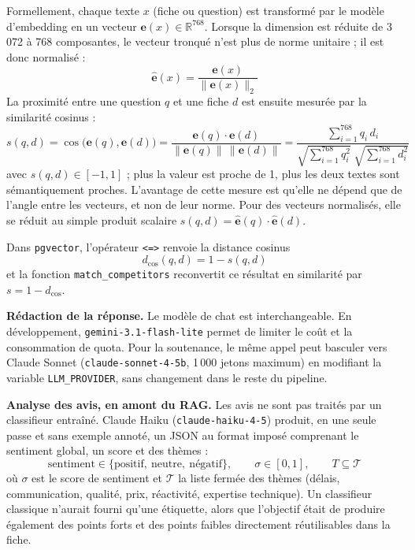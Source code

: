 Formellement, chaque texte $x$ (fiche ou question) est transformé par le modèle d'embedding en un vecteur
$\mathbf{e}(x) \in \mathbb{R}^{768}$. Lorsque la dimension est réduite de 3\,072 à 768 composantes, le vecteur
tronqué n'est plus de norme unitaire ; il est donc normalisé :
\begin{equation}
    \hat{\mathbf{e}}(x) = \frac{\mathbf{e}(x)}{\lVert \mathbf{e}(x) \rVert_2}
    \label{eq:norme}
\end{equation}
La proximité entre une question $q$ et une fiche $d$ est ensuite mesurée par la similarité cosinus :
\begin{equation}
    s(q, d) = \cos\big(\mathbf{e}(q), \mathbf{e}(d)\big)
    = \frac{\mathbf{e}(q) \cdot \mathbf{e}(d)}{\lVert \mathbf{e}(q) \rVert \, \lVert \mathbf{e}(d) \rVert}
    = \frac{\sum_{i=1}^{768} q_i \, d_i}
           {\sqrt{\sum_{i=1}^{768} q_i^{2}} \; \sqrt{\sum_{i=1}^{768} d_i^{2}}}
    \label{eq:cosine}
\end{equation}
avec $s(q,d) \in [-1, 1]$ ; plus la valeur est proche de 1, plus les deux textes sont sémantiquement proches.
L'avantage de cette mesure est qu'elle ne dépend que de l'angle entre les vecteurs, et non de leur norme. Pour
des vecteurs normalisés, elle se réduit au simple produit scalaire $s(q,d) = \hat{\mathbf{e}}(q) \cdot \hat{\mathbf{e}}(d)$.

Dans \texttt{pgvector}, l'opérateur \texttt{<=>} renvoie la distance cosinus
\begin{equation}
    d_{\cos}(q,d) = 1 - s(q,d)
    \label{eq:distance}
\end{equation}
et la fonction \texttt{match\_competitors} reconvertit ce résultat en similarité par $s = 1 - d_{\cos}$.

\textbf{Rédaction de la réponse.} Le modèle de chat est interchangeable. En développement,
\texttt{gemini-3.1-flash-lite} permet de limiter le coût et la consommation de quota. Pour la soutenance, le
même appel peut basculer vers Claude Sonnet (\texttt{claude-sonnet-4-5b}, 1\,000 jetons maximum) en
modifiant la variable \texttt{LLM\_PROVIDER}, sans changement dans le reste du pipeline.

\textbf{Analyse des avis, en amont du RAG.} Les avis ne sont pas traités par un classifieur entraîné. Claude
Haiku (\texttt{claude-haiku-4-5}) produit, en une seule passe et sans exemple annoté, un JSON au format imposé
comprenant le sentiment global, un score et des thèmes :
\begin{equation}
    \text{sentiment} \in \{\text{positif},\ \text{neutre},\ \text{négatif}\}, \qquad
    \sigma \in [0, 1], \qquad
    T \subseteq \mathcal{T}
    \label{eq:avis}
\end{equation}
où $\sigma$ est le score de sentiment et $\mathcal{T}$ la liste fermée des thèmes (délais, communication,
qualité, prix, réactivité, expertise technique). Un classifieur classique n'aurait fourni qu'une étiquette,
alors que l'objectif était de produire également des points forts et des points faibles directement
réutilisables dans la fiche.


